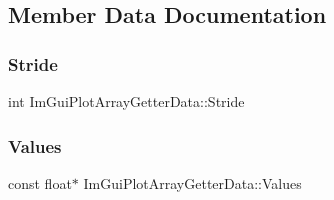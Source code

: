 \subsection{Member Data Documentation}
\hypertarget{struct_im_gui_plot_array_getter_data_aecb2cce4ea91d95ec81937de656cfcd6}{}\label{struct_im_gui_plot_array_getter_data_aecb2cce4ea91d95ec81937de656cfcd6} 
\subsubsection{\texorpdfstring{Stride}{Stride}}
{\footnotesize\ttfamily int Im\+Gui\+Plot\+Array\+Getter\+Data\+::\+Stride}

\hypertarget{struct_im_gui_plot_array_getter_data_aa40ff2e945549744fc622891089ae0fd}{}\label{struct_im_gui_plot_array_getter_data_aa40ff2e945549744fc622891089ae0fd} 
\subsubsection{\texorpdfstring{Values}{Values}}
{\footnotesize\ttfamily const float$\ast$ Im\+Gui\+Plot\+Array\+Getter\+Data\+::\+Values}

